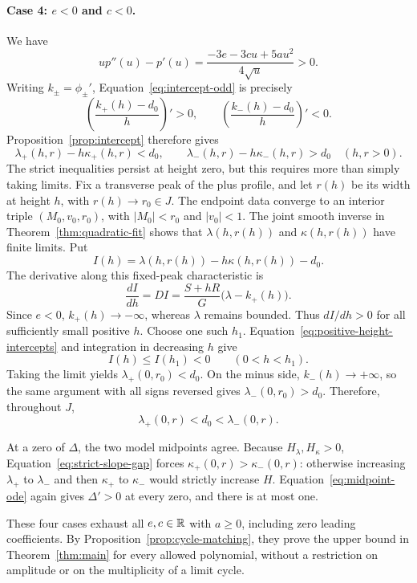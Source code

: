 \paragraph{Case 4: $e<0$ and $c<0$.}
We have
\begin{equation}\label{eq:intercept-odd}
 up''(u)-p'(u)=
 \frac{-3e-3cu+5au^2}{4\sqrt u}>0.
\end{equation}
Writing $k_\pm=\phi_\pm'$, Equation~\eqref{eq:intercept-odd}
is precisely
\[
 \left(\frac{k_+(h)-d_0}{h}\right)'>0,\qquad
 \left(\frac{k_-(h)-d_0}{h}\right)'<0.
\]
Proposition~\ref{prop:intercept} therefore gives
\begin{equation}\label{eq:positive-height-intercepts}
 \lambda_+(h,r)-h\kappa_+(h,r)<d_0,\qquad
 \lambda_-(h,r)-h\kappa_-(h,r)>d_0
 \quad(h,r>0).
\end{equation}
The strict inequalities persist at height zero, but this requires
more than simply taking limits. Fix a transverse peak of the plus
profile, and let $r(h)$ be its width at height $h$, with
$r(h)\to r_0\in J$. The endpoint data converge to an interior
triple $(M_0,v_0,r_0)$, with $|M_0|<r_0$ and $|v_0|<1$.
The joint smooth inverse in Theorem~\ref{thm:quadratic-fit}
shows that $\lambda(h,r(h))$ and $\kappa(h,r(h))$ have finite
limits. Put
\[
 I(h)=\lambda(h,r(h))-h\kappa(h,r(h))-d_0.
\]
The derivative along this fixed-peak characteristic is
\begin{equation}\label{eq:strict-boundary-intercept}
 \frac{dI}{dh}=DI=\frac{S+hR}{G}\bigl(\lambda-k_+(h)\bigr).
\end{equation}
Since $e<0$, $k_+(h)\to-\infty$, whereas $\lambda$ remains
bounded. Thus $dI/dh>0$ for all sufficiently small positive $h$.
Choose one such $h_1$. Equation~\eqref{eq:positive-height-intercepts}
and integration in decreasing $h$ give
\[
 I(h)\le I(h_1)<0\qquad(0<h<h_1).
\]
Taking the limit yields $\lambda_+(0,r_0)<d_0$. On the minus side,
$k_-(h)\to+\infty$, so the same argument with all signs reversed
gives $\lambda_-(0,r_0)>d_0$. Therefore, throughout $J$,
\begin{equation}\label{eq:strict-slope-gap}
 \lambda_+(0,r)<d_0<\lambda_-(0,r).
\end{equation}

At a zero of $\Delta$, the two model midpoints agree. Because
$H_\lambda,H_\kappa>0$, Equation~\eqref{eq:strict-slope-gap}
forces $\kappa_+(0,r)>\kappa_-(0,r)$: otherwise increasing
$\lambda_+$ to $\lambda_-$ and then $\kappa_+$ to $\kappa_-$
would strictly increase $H$. Equation~\eqref{eq:midpoint-ode}
again gives $\Delta'>0$ at every zero, and there is at most one.

These four cases exhaust all $e,c\in\mathbb R$ with $a\ge0$, including
zero leading coefficients. By Proposition~\ref{prop:cycle-matching},
they prove the upper bound in Theorem~\ref{thm:main} for every
allowed polynomial, without a restriction on amplitude or on
the multiplicity of a limit cycle.
